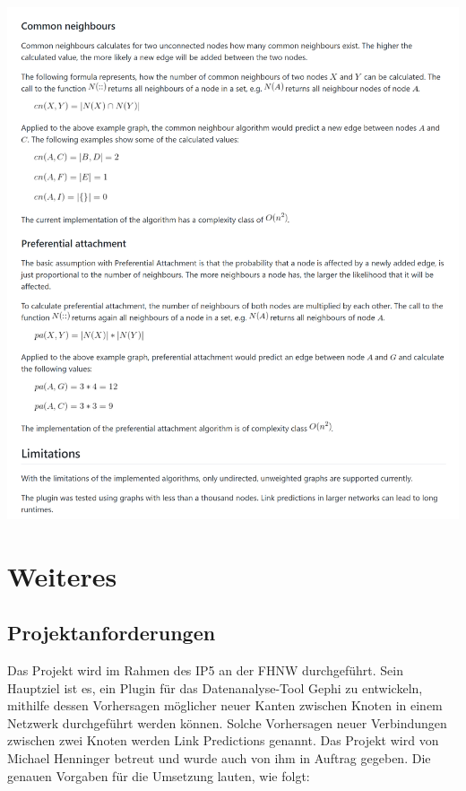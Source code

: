 \includegraphics[width=\textwidth]{resources/readme_pt3.png}



\chapter{Weiteres}

\section{Projektanforderungen}
\label{projektanforderungen}
Das Projekt wird im Rahmen des IP5 an der FHNW durchgeführt. Sein Hauptziel ist es, ein Plugin für das Datenanalyse-Tool Gephi zu entwickeln, mithilfe dessen Vorhersagen möglicher neuer Kanten zwischen Knoten in einem Netzwerk durchgeführt werden können. Solche Vorhersagen neuer Verbindungen zwischen zwei Knoten werden Link Predictions genannt. Das Projekt wird von Michael Henninger betreut und wurde auch von ihm in Auftrag gegeben.
Die genauen Vorgaben für die Umsetzung lauten, wie folgt:

